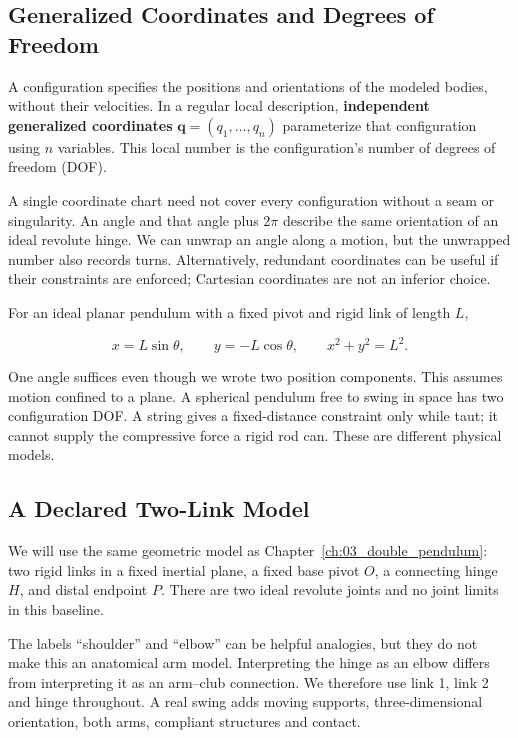 \subsection{Generalized Coordinates and Degrees of Freedom}\label{ch02:generalized-coordinates-and-degrees-of-freedom}

\protect{}\label{ch02:generalized-coordinates}{}

A configuration specifies the positions and orientations of the modeled bodies, without their velocities. In a regular local description, \textbf{independent generalized coordinates} \(\bm q=(q_1,\ldots,q_n)\) parameterize that configuration using \(n\) variables. This local number is the configuration's number of degrees of freedom (DOF).

A single coordinate chart need not cover every configuration without a seam or singularity. An angle and that angle plus \(2\pi\) describe the same orientation of an ideal revolute hinge. We can unwrap an angle along a motion, but the unwrapped number also records turns. Alternatively, redundant coordinates can be useful if their constraints are enforced; Cartesian coordinates are not an inferior choice.

For an ideal planar pendulum with a fixed pivot and rigid link of length \(L\),

\[
x=L\sin\theta,\qquad y=-L\cos\theta,\qquad x^2+y^2=L^2.
\]

One angle suffices even though we wrote two position components. This assumes motion confined to a plane. A spherical pendulum free to swing in space has two configuration DOF. A string gives a fixed-distance constraint only while taut; it cannot supply the compressive force a rigid rod can. These are different physical models.

\subsection{A Declared Two-Link Model}\label{ch02:a-declared-two-link-model}

We will use the same geometric model as Chapter~\ref{ch:03_double_pendulum}: two rigid links in a fixed inertial plane, a fixed base pivot \(O\), a connecting hinge \(H\), and distal endpoint \(P\). There are two ideal revolute joints and no joint limits in this baseline.

The labels ``shoulder'' and ``elbow'' can be helpful analogies, but they do not make this an anatomical arm model. Interpreting the hinge as an elbow differs from interpreting it as an arm--club connection. We therefore use link 1, link 2 and hinge throughout. A real swing adds moving supports, three-dimensional orientation, both arms, compliant structures and contact.

